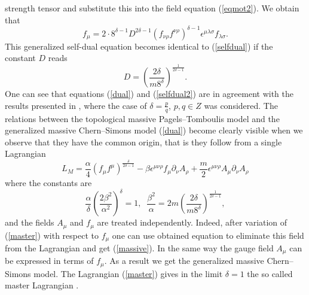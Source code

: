\documentclass[a4 paper, 12 pt] {article}
\begin{document}
strength tensor and substitute this into the field equation
(\ref{eqmot2}).  We obtain that
\begin{equation}
f_{\mu } =2 \cdot 8^{\delta -1} D^{2
\delta -1}
\left(f_{ \nu  \rho} f^{\nu \rho } \right)^{\delta -1} \epsilon^{\mu
\lambda \sigma } f_{\lambda \sigma }.
\label{selfdual2}
\end{equation}
This generalized self-dual equation becomes identical to (\ref{selfdual})
if the constant $D$ reads
\begin{equation}
D=\left( \frac{2\delta }{m8^{\delta }} \right)^{\frac{1}{2\delta -1}}.
\label{const}
\end{equation}
One can see that equations (\ref{dual}) and (\ref{selfdual2}) are in
agreement with the results presented in \cite{Ilha}, where the case of
$\delta =\frac{p}{q}$, $p,q \in Z$ was considered. The relations between
the topological massive Pagels--Tomboulis model and the generalized
massive Chern--Simons model (\ref{dual}) become clearly visible when we
observe that they have the common origin, that is they follow from a
single Lagrangian
\begin{equation}
L_M=\frac{\alpha}{4} (f_{\mu} f^{\mu} )^{\frac{\delta }{2 \delta -1}}
-\beta
\epsilon^{\mu \nu \rho} f_{\mu } \partial_{\nu }A_{\rho } +\frac{m}{2}
\epsilon^{\mu \nu \rho} A_{\mu }\partial_{\nu } A_{\rho }
\label{master}
\end{equation}
where the constants are
\begin{equation}
\frac{\alpha }{\delta } \left( \frac{2 \beta^2}{\alpha^2}
\right)^{\delta }=1, \; \; \frac{\beta^2}{\alpha } = 2m \left(
\frac{2\delta }{m 8^{\delta }} \right)^{\frac{1}{2\delta -1}},
\label{masterconst}
\end{equation}
and the fields $A_{\mu }$ and $f_{\mu }$ are treated independently.
Indeed, after variation of (\ref{master}) with respect to $f_{\mu }$ one
can use obtained equation to eliminate this field from the Lagrangian and
get (\ref{massive}). In the same way the gauge field $A_{\mu }$ can be
expressed in terms of $f_{\mu }$. As a result we get the generalized
massive Chern--Simons model. The Lagrangian (\ref{master}) gives in the
limit $\delta =1$ the so called master Lagrangian \cite{Jackiw}.
\end{document}
